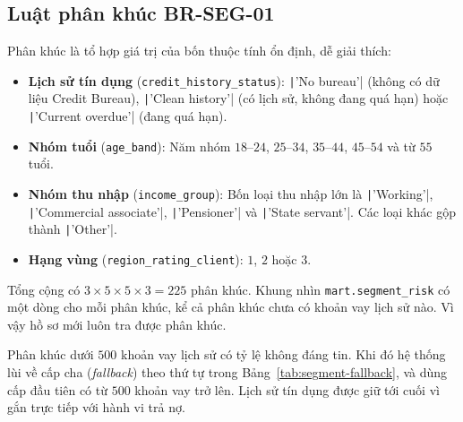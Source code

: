 \subsection{Luật phân khúc BR-SEG-01}
\label{sec:dss-segment-rule}
Phân khúc là tổ hợp giá trị của bốn thuộc tính ổn định, dễ giải thích:
\begin{itemize}[topsep=0pt, itemsep=1pt]
	\item \textbf{Lịch sử tín dụng} (\texttt{credit\_history\_status}): \texttt|'No bureau'| (không có dữ liệu Credit Bureau), \texttt|'Clean history'| (có lịch sử, không đang quá hạn) hoặc \texttt|'Current overdue'| (đang quá hạn).
	\item \textbf{Nhóm tuổi} (\texttt{age\_band}): Năm nhóm $18$--$24$, $25$--$34$, $35$--$44$, $45$--$54$ và từ $55$ tuổi.
	\item \textbf{Nhóm thu nhập} (\texttt{income\_group}): Bốn loại thu nhập lớn là \texttt|'Working'|, \texttt|'Commercial associate'|, \texttt|'Pensioner'| và \texttt|'State servant'|. Các loại khác gộp thành \texttt|'Other'|.
	\item \textbf{Hạng vùng} (\texttt{region\_rating\_client}): $1$, $2$ hoặc $3$.
\end{itemize}

Tổng cộng có $3 \times 5 \times 5 \times 3 = 225$ phân khúc. Khung nhìn \texttt{mart.segment\_risk} có một dòng cho mỗi phân khúc, kể cả phân khúc chưa có khoản vay lịch sử nào. Vì vậy hồ sơ mới luôn tra được phân khúc.

\medskip

Phân khúc dưới $500$ khoản vay lịch sử có tỷ lệ không đáng tin. Khi đó hệ thống lùi về cấp cha (\textit{fallback}) theo thứ tự trong Bảng~\ref{tab:segment-fallback}, và dùng cấp đầu tiên có từ $500$ khoản vay trở lên. Lịch sử tín dụng được giữ tới cuối vì gắn trực tiếp với hành vi trả nợ.

